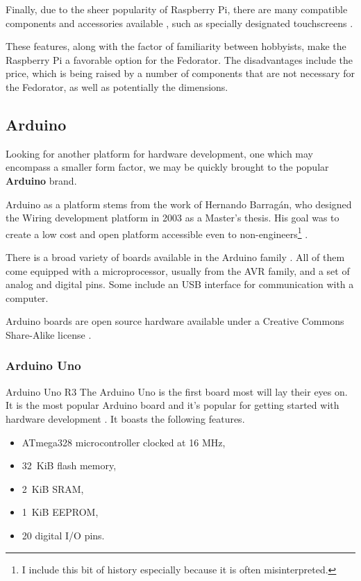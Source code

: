             Finally, due to the sheer popularity of Raspberry Pi, there are many compatible components and accessories available \cite{rpi-rs-components} \cite{rpi-the-pi-hut-store}, such as specially designated touchscreens \cite{rpi-official-touchscreen}.
            
            These features, along with the factor of familiarity between hobbyists, make the Raspberry Pi a favorable option for the Fedorator.  The disadvantages include the price, which is being raised by a number of components that are not necessary for the Fedorator, as well as potentially the dimensions.
        \subsection{Arduino}
            Looking for another platform for hardware development, one which may encompass a smaller form factor, we may be quickly brought to the popular \textbf{Arduino} brand.
            
            Arduino as a platform stems from the work of Hernando Barragán, who designed the Wiring development platform in 2003 as a Master's thesis.  His goal was to create a low cost and open platform accessible even to non-engineers\footnote{I include this bit of history especially because it is often misinterpreted.} \cite{arduino-untold-history}. 
            
            There is a broad variety of boards available in the Arduino family \cite{arduino-products}.  All of them come equipped with a microprocessor, usually from the AVR family, and a set of analog and digital pins.  Some include an USB interface for communication with a computer.
            
            Arduino boards are open source hardware available under a Creative Commons Share-Alike license \cite{arduino-faq-open-hw}.
            
            \subsubsection{Arduino Uno}
                    {Arduino Uno R3  \cite{arduino-wikimedia-uno}}
                The Arduino Uno is the first board most will lay their eyes on.  It is the most popular Arduino board and it's popular for getting started with hardware development \cite{arduino-uno}.  It boasts the following features.
                
                \begin{itemize}
                    \item ATmega328 microcontroller clocked at 16 MHz,
                    \item 32~KiB flash memory,
                    \item 2~KiB SRAM,
                    \item 1~KiB EEPROM,
                    \item 20 digital I/O pins.
                \end{itemize}
                
